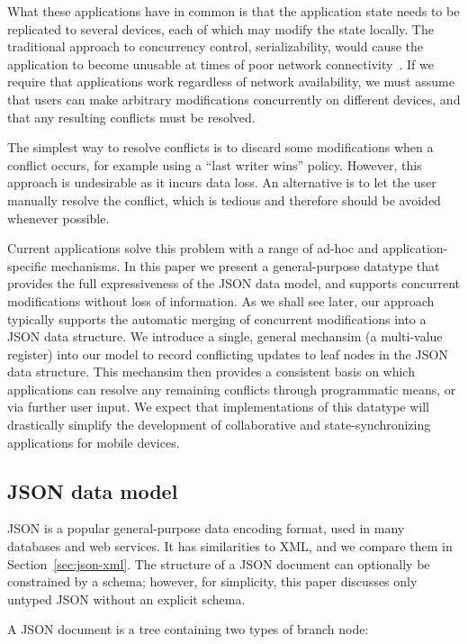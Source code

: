 \documentclass[10pt,journal,compsoc]{IEEEtran}
\begin{document}
What these applications have in common is that the application state needs to be replicated to several devices, each of which may modify the state locally. The traditional approach to concurrency control, serializability, would cause the application to become unusable at times of poor network connectivity~\cite{Davidson:1985hv}. If we require that applications work regardless of network availability, we must assume that users can make arbitrary modifications concurrently on different devices, and that any resulting conflicts must be resolved.

The simplest way to resolve conflicts is to discard some modifications when a conflict occurs, for example using a ``last writer wins'' policy. However, this approach is undesirable as it incurs data loss. An alternative is to let the user manually resolve the conflict, which is tedious and therefore should be avoided whenever possible.

Current applications solve this problem with a range of ad-hoc and application-specific mechanisms. In this paper we present a general-purpose datatype that provides the full expressiveness of the JSON data model, and supports concurrent modifications without loss of information. As we shall see later, our approach typically supports the automatic merging of concurrent modifications into a JSON data structure. We introduce a single, general mechansim (a multi-value register) into our model to record conflicting updates to leaf nodes in the JSON data structure. This mechansim then provides a consistent basis on which applications can resolve any remaining conflicts through programmatic means, or via further user input.  We expect that implementations of this datatype will drastically simplify the development of collaborative and state-synchronizing applications for mobile devices.

\subsection{JSON data model}

JSON is a popular general-purpose data encoding format, used in many databases and web services. It has similarities to XML, and we compare them in Section~\ref{sec:json-xml}. The structure of a JSON document can optionally be constrained by a schema; however, for simplicity, this paper discusses only untyped JSON without an explicit schema.

A JSON document is a tree containing two types of branch node:
\end{document}
